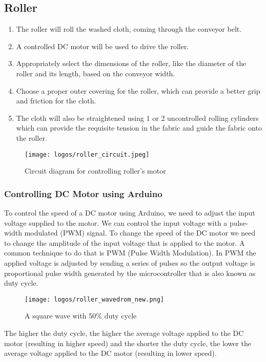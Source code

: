 \documentclass[table,french,english]{rapportCS}
\begin{document}
\subsection{Roller}\label{sec:roller}
\begin{enumerate}
  \item The roller will roll the washed cloth, coming through the conveyor belt.
  \item A controlled DC motor will be used to drive the roller.
  \item Appropriately select the dimensions of the roller, like the diameter of the roller and its length, based on the conveyor width.
  \item Choose a proper outer covering for the roller, which can provide a better grip and friction for the cloth.
  \item The cloth will also be straightened using 1 or 2 uncontrolled rolling cylinders which can provide the requisite tension in the fabric and guide the fabric onto the roller.
\end{enumerate}
\begin{figure}[h]
    \centering
    \texttt{[image: logos/roller\_circuit.jpeg]}
    \caption{Circuit diagram for controlling roller's motor }                   
    \label{fig:outlinemindmap}
\end{figure}

\subsubsection{Controlling DC Motor using Arduino}\label{sec:contdcmotor}

To control the speed of a DC motor using \gls{Arduino}, we need to adjust the input voltage supplied to the motor. 
We can control the input voltage with a pulse-width modulated (PWM) signal.
To change the speed of the DC motor we need to change the amplitude of the input voltage that is applied to the motor.
A common technique to do that is PWM (Pulse Width Modulation). In PWM the applied voltage is adjusted by sending a series of pulses so the output voltage is proportional pulse width generated by the  \gls{microcontroller} that is also known as duty cycle.
\newpage
\begin{figure}[h]
    \centering
    \texttt{[image: logos/roller\_wavedrom\_new.png]}
    \caption{A square wave with 50\% duty cycle}
    \label{fig:outlinemindmap}
\end{figure}
The higher the duty cycle, the higher the average voltage applied to the DC motor (resulting in higher speed) and the shorter the duty cycle, the lower the average voltage applied to the DC motor (resulting in lower speed).
\end{document}

